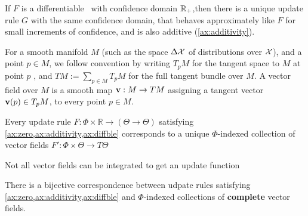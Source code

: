 
\begin{prop}
	If $F$ is a differentiable \cofunc\ with confidence domain $\mathbb R_+$,then there is a unique update rule $G$ with the same confidence domain, that behaves approximately like $F$ for small increments of confidence, and is also additive (\cref{ax:additivity}).
\end{prop}





\label{sec:vecrep}
For a smooth manifold $M$
(such as the space $\Delta \mathcal X$ of distributions over $\mathcal X$),
and a point $p \in M$, we follow convention by writing $T_p M$ for the tangent space to $M$ at point $p$ \parencite{lee2013smooth}, and %
$TM := \sum_{p \in M} T_p M$ for the full tangent bundle over $M$.
%
A vector field over $M$ is a smooth map $\mathbf{v} : M \to T M$ assigning a tangent vector $\mathbf{v}(p) \in T_p M$, to every point $p \in M$.

\begin{theorem}
Every update rule $F : \Phi \times \mathbb R \to (\Theta  \to \Theta)$
satisfying \cref{ax:zero,ax:additivity,ax:diffble} corresponds to a unique
$\Phi$-indexed collection of vector fields
    $F' : \Phi \times \Theta \to T\Theta$
\end{theorem}

Not all vector fields can be integrated to get an update function

\begin{coro}\label{thm:vecrep}
There is a bijective correspondence between udpate rules satisfying \cref{ax:zero,ax:additivity,ax:diffble} and $\Phi$-indexed collections of \textbf{complete} vector fields.
\end{coro}


